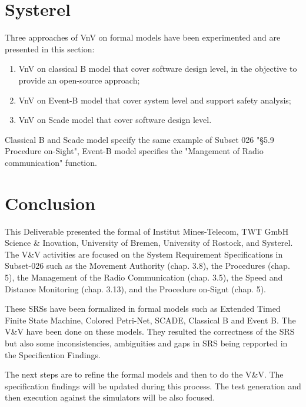 \documentclass{template/openetcs_article}
\begin{document}
\section{Systerel}

Three approaches of VnV  on formal models have been experimented and are
presented in this section:

\begin{enumerate}
\item VnV on classical B  model that cover software design level, in the objective to provide an open-source approach;
\item VnV on Event-B model that cover system level and support safety analysis;
\item VnV on Scade model that cover software design level.
\end{enumerate}

Classical B and Scade model specify the same example of Subset 026 "§5.9
Procedure on-Sight", Event-B model specifies the "Mangement of Radio
communication" function.








\section{Conclusion}

This Deliverable presented the formal \vv of Institut
Mines-Telecom, TWT GmbH Science \& Inovation, University of Bremen, University of Rostock, and
Systerel.
The V\&V activities are focused on the System Requirement Specifications in
Subset-026 such as the Movement Authority (chap. 3.8), the Procedures (chap. 5),
the Management of the Radio Communication (chap. 3.5), the Speed and Distance
Monitoring (chap. 3.13), and the Procedure on-Signt (chap. 5).

These SRSs have been formalized in formal models such as  Extended Timed Finite
State Machine, Colored Petri-Net, SCADE, Classical B and Event B.
The V\&V have been done on these models. They resulted
the correctness of the SRS but also
some inconsistencies, ambiguities and gaps in SRS being
repported in the Specification Findings.

The next steps are to refine the formal models and then to do the V\&V.
The specification findings will be updated during this process.
The test generation and then execution against the
simulators will be also focused.




\nocite{*}

%



%
\end{document}
